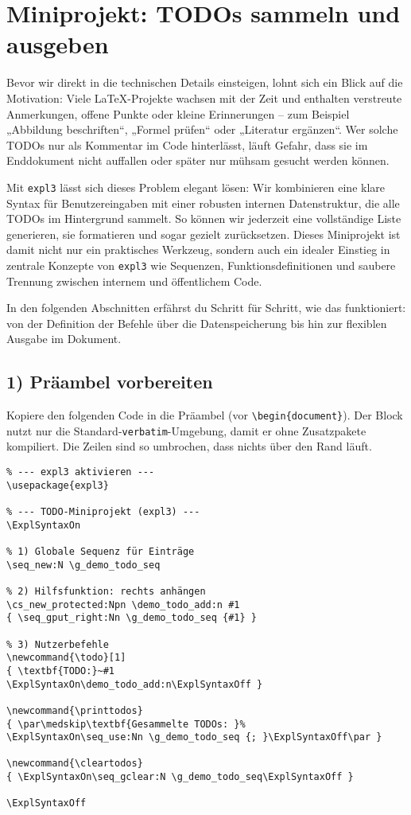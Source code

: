 \documentclass[11pt,a4paper]{book}
\newcommand{\todo}[1]{\textbf{TODO:}~#1\ExplSyntaxOn\demo_todo_add:n{#1}\ExplSyntaxOff}
\newcommand{\printtodos}{\par\medskip\textbf{Gesammelte TODOs: }\ExplSyntaxOn\seq_use:Nn \g_demo_todo_seq {; }\ExplSyntaxOff\par}
\newcommand{\cleartodos}{\ExplSyntaxOn\seq_gclear:N \g_demo_todo_seq\ExplSyntaxOff}
\begin{document}
\chapter{Miniprojekt: TODOs sammeln und ausgeben}
\label{chap:todo}
Bevor wir direkt in die technischen Details einsteigen, lohnt sich ein Blick auf die Motivation: Viele LaTeX-Projekte wachsen mit der Zeit und enthalten verstreute Anmerkungen, offene Punkte oder kleine Erinnerungen – zum Beispiel „Abbildung beschriften“, „Formel prüfen“ oder „Literatur ergänzen“. Wer solche TODOs nur als Kommentar im Code hinterlässt, läuft Gefahr, dass sie im Enddokument nicht auffallen oder später nur mühsam gesucht werden können.

Mit \texttt{expl3} lässt sich dieses Problem elegant lösen: Wir kombinieren eine klare Syntax für Benutzereingaben mit einer robusten internen Datenstruktur, die alle TODOs im Hintergrund sammelt. So können wir jederzeit eine vollständige Liste generieren, sie formatieren und sogar gezielt zurücksetzen. Dieses Miniprojekt ist damit nicht nur ein praktisches Werkzeug, sondern auch ein idealer Einstieg in zentrale Konzepte von \texttt{expl3} wie Sequenzen, Funktionsdefinitionen und saubere Trennung zwischen internem und öffentlichem Code.

In den folgenden Abschnitten erfährst du Schritt für Schritt, wie das funktioniert: von der Definition der Befehle über die Datenspeicherung bis hin zur flexiblen Ausgabe im Dokument.

\section*{1) Präambel vorbereiten}
Kopiere den folgenden Code in die Präambel (vor \verb|\begin{document}|). Der Block nutzt nur die Standard-\verb|verbatim|-Umgebung, damit er ohne Zusatzpakete kompiliert. Die Zeilen sind so umbrochen, dass nichts über den Rand läuft.

\begin{verbatim}
% --- expl3 aktivieren ---
\usepackage{expl3}

% --- TODO-Miniprojekt (expl3) ---
\ExplSyntaxOn

% 1) Globale Sequenz für Einträge
\seq_new:N \g_demo_todo_seq

% 2) Hilfsfunktion: rechts anhängen
\cs_new_protected:Npn \demo_todo_add:n #1
{ \seq_gput_right:Nn \g_demo_todo_seq {#1} }

% 3) Nutzerbefehle
\newcommand{\todo}[1]
{ \textbf{TODO:}~#1
\ExplSyntaxOn\demo_todo_add:n\ExplSyntaxOff }

\newcommand{\printtodos}
{ \par\medskip\textbf{Gesammelte TODOs: }%
\ExplSyntaxOn\seq_use:Nn \g_demo_todo_seq {; }\ExplSyntaxOff\par }

\newcommand{\cleartodos}
{ \ExplSyntaxOn\seq_gclear:N \g_demo_todo_seq\ExplSyntaxOff }

\ExplSyntaxOff
\end{verbatim}
\end{document}
